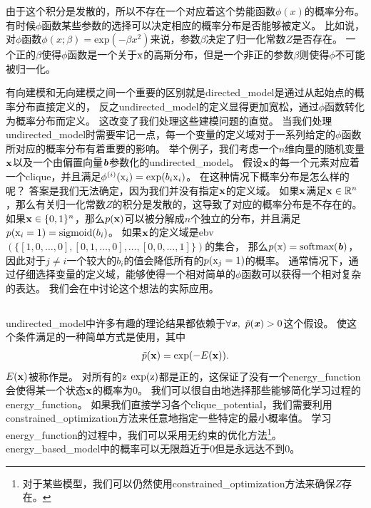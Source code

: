 由于这个积分是发散的，所以不存在一个对应着这个势能函数$\phi(x)$的概率分布。
有时候$\phi$函数某些参数的选择可以决定相应的概率分布是否能够被定义。
比如说，对$\phi$函数$\phi(x;\beta) = \text{exp}(-\beta x^2)$来说，参数$\beta$决定了归一化常数$Z$是否存在。
一个正的$\beta$使得$\phi$函数是一个关于$\mathrm{x}$的高斯分布，但是一个非正的参数$\beta$则使得$\phi$不可能被归一化。


有向建模和无向建模之间一个重要的区别就是\gls{directed_model}是通过从起始点的概率分布直接定义的，
反之\gls{undirected_model}的定义显得更加宽松，通过$\phi$函数转化为概率分布而定义。
这改变了我们处理这些建模问题的直觉。
当我们处理\gls{undirected_model}时需要牢记一点，每一个变量的定义域对于一系列给定的$\phi$函数所对应的概率分布有着重要的影响。
举个例子，我们考虑一个$n$维向量的随机变量$\mathbf{x}$以及一个由偏置向量$\boldsymbol{\mathit{b}}$参数化的\gls{undirected_model}。
假设$\mathbf{x}$的每一个元素对应着一个\gls{clique}，并且满足$\phi^{(i)}(\mathrm{x}_i) = \exp(b_i\mathrm{x}_i)$。
在这种情况下概率分布是怎么样的呢？
答案是我们无法确定，因为我们并没有指定$\mathbf{x}$的定义域。
如果$\mathbf{x}$满足$\mathbf{x} \in \mathbb{R}^n$，那么有关归一化常数$Z$的积分是发散的，这导致了对应的概率分布是不存在的。
如果$\mathbf{x}\in\{0,1\}^n$，那么$p(\mathbf{x})$可以被分解成$n$个独立的分布，并且满足$p(\mathrm{x}_i=1) = \text{sigmoid}(b_i)$。
如果$\mathbf{x}$的定义域是\gls{ebv} $(\{[1,0,\ldots,0],[0,1,\ldots,0],\ldots,[0,0,\ldots,1]\})$的集合，
那么$p(\mathrm{x}) = \text{softmax}(\boldsymbol{\mathit{b}})$，因此对于$j\neq i$一个较大的$b_i$的值会降低所有的$p(\mathrm{x}_j = 1)$的概率。
通常情况下，通过仔细选择变量的定义域，能够使得一个相对简单的$\phi$函数可以获得一个相对复杂的表达。
我们会在中讨论这个想法的实际应用。


\subsection{}
\label{sec:energy_based_models}


\gls{undirected_model}中许多有趣的理论结果都依赖于$\forall \boldsymbol{\mathit{x}},\ \tilde{p}(\boldsymbol{\mathit{x}})>0$这个假设。
使这个条件满足的一种简单方式是使用，其中
\begin{align}
\label{eqn:167}
\tilde{p}(\mathbf{x}) = \exp(-E(\mathbf{x})).
\end{align}
$E(\mathbf{x})$被称作是。
对所有的$\mathrm{z}$ $\exp(\mathrm{z})$都是正的，这保证了没有一个\gls{energy_function}会使得某一个状态$\mathbf{x}$的概率为$0$。
我们可以很自由地选择那些能够简化学习过程的\gls{energy_function}。
如果我们直接学习各个\gls{clique_potential}，我们需要利用\gls{constrained_optimization}方法来任意地指定一些特定的最小概率值。
学习\gls{energy_function}的过程中，我们可以采用无约束的优化方法\footnote{对于某些模型，我们可以仍然使用\gls{constrained_optimization}方法来确保$Z$存在。}。
\gls{energy_based_model}中的概率可以无限趋近于$0$但是永远达不到$0$。


